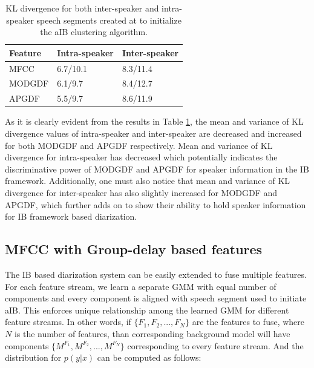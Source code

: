 \documentclass[conference]{IEEEtran}
\begin{document}
\begin{table}[h]
\centering

\label{table:kl-div}
\begin{tabular}{|l|l|l|}
\hline
Feature 			& Intra-speaker 			& Inter-speaker 	 \\ \hline
MFCC          			& 6.7/10.1               & 8.3/11.4       \\ \hline
MODGDF        			& 6.1/9.7                & 8.4/12.7       \\ \hline
APGDF         			& 5.5/9.7                & 8.6/11.9        \\ \hline
\end{tabular}

\vspace{0.4cm}
\caption{KL divergence for both inter-speaker and intra-speaker speech segments
created at to initialize the aIB clustering algorithm.}
\end{table}

As it is clearly evident from the results in Table \ref{table:kl-div}, the mean
and variance of KL divergence values of intra-speaker and inter-speaker are
decreased and increased for both MODGDF and APGDF respectively. Mean and
variance of KL divergence for intra-speaker has decreased which potentially
indicates the discriminative power of MODGDF and APGDF for speaker information
in the IB framework. Additionally, one must also notice that mean and variance
of KL divergence for inter-speaker has also slightly increased for MODGDF and
APGDF, which further adds on to show their ability to hold speaker information
for IB framework based diarization.  

\subsection{MFCC with Group-delay based features}
\label{feature_fusion}
The IB based diarization system can be easily extended to fuse multiple
features. For each feature stream, we learn a separate GMM with equal number of
components and every component is aligned with speech segment used to initiate
aIB. This enforces unique relationship among the learned GMM for different
feature streams. In other words, if $\lbrace F_1,F_2,...,F_N \rbrace$ are the
features to fuse, where $N$ is the number of features, than corresponding
background model will have components $\lbrace
M^{F_{1}},M^{F_{2}},...,M^{F_{N}}\rbrace$ corresponding to every feature stream.
And the distribution for $p(y|x)$ can be computed as follows:       
\end{document}
